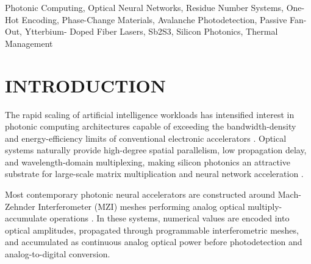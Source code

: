 \documentclass[journal]{IEEEtran}
\begin{document}
\begin{abstract}
Each optical tile natively implements an 8-bit residue channel over 256 spatial waveguides (supporting direct 4-bit $\times$ 4-bit $\to$ 8-bit element-wise multiplications per tile at $k=1$). To scale precision to wide integer word lengths (e.g., INT8 to INT64), JANUS employs Spatial Residue Number System decomposition across $k$ parallel tiles and exact digital reconstruction using the Chinese Remainder Theorem (CRT) \cite{Mohan2016}\cite{Wang2000}\cite{Xia2000}. This decouples arithmetic precision from analog optical fidelity, operating entirely within bounded thermal, optical, and electrical regimes while sustaining deterministic exact computation. 

Across three deployment configurations---Mini, Edge, and Datacenter---JANUS achieves sustained exact 64-bit throughput ranging from $174.5$~TMAC/s to $2,758.5$~TMAC/s under bounded operating conditions without continuous optical calibration. The architecture demonstrates that large-scale photonic AI acceleration becomes physically realizable only when analog precision recovery is replaced by spatially encoded exact arithmetic.

\end{abstract}

\begin{IEEEkeywords}
Photonic Computing, Optical Neural Networks, Residue Number Systems, One-Hot Encoding, Phase-Change Materials, Avalanche Photodetection, Passive Fan-Out, Ytterbium- Doped Fiber Lasers, Sb2S3, Silicon Photonics, Thermal Management
\end{IEEEkeywords}

\section{INTRODUCTION}

The rapid scaling of artificial intelligence workloads has intensified interest in photonic computing architectures capable of exceeding the bandwidth-density and energy-efficiency limits of conventional electronic accelerators \cite{Miller2017}\cite{Miller2013}. Optical systems naturally provide high-degree spatial parallelism, low propagation delay, and wavelength-domain multiplexing, making silicon photonics an attractive substrate for large-scale matrix multiplication and neural network acceleration \cite{Shen2017}\cite{Tait2017}\cite{Ashtiani2022}\cite{Feldmann2019}. 

Most contemporary photonic neural accelerators are constructed around Mach-Zehnder Interferometer (MZI) meshes performing analog optical multiply-accumulate operations \cite{Shen2017}\cite{Harris2018}\cite{Feldmann2021}\cite{Reed2010}\cite{Sinatkas2021}. In these systems, numerical values are encoded into optical amplitudes, propagated through programmable interferometric meshes, and accumulated as continuous analog optical power before photodetection and analog-to-digital conversion.
\end{document}

